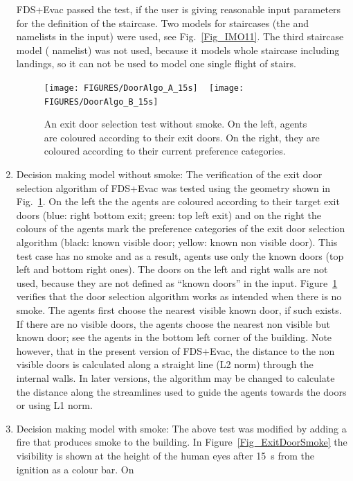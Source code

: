 \documentclass[12pt,a4paper,final,twoside]{stylevk}
\begin{document}
\begin{enumerate}
  FDS+Evac passed the test, if the user is giving reasonable input
  parameters for the definition of the staircase.  Two models for
  staircases (the  and  namelists in the
  input) were used, see Fig.~\ref{Fig_IMO11}.  The third staircase
  model ( namelist) was not used, because it models
  whole staircase including landings, so it can not be used to model
  one single flight of stairs.
%
\begin{figure}[!tb]
  \centerline{\texttt{[image: FIGURES/DoorAlgo\_A\_15s]} ~ \texttt{[image: FIGURES/DoorAlgo\_B\_15s]}} 
  \caption{An exit door selection test without
    smoke.  On the left, agents are coloured according to their exit
    doors. On the right, they are coloured according to their current
    preference categories.}\label{Fig_ExitDoorNoSmoke}
\end{figure}
%
%
\item Decision making model without smoke: The verification of the
  exit door selection algorithm of FDS+Evac was tested using the
  geometry shown in Fig.~\ref{Fig_ExitDoorNoSmoke}.  On the left the
  the agents are coloured according to their target exit doors (blue:
  right bottom exit; green: top left exit) and on the right the
  colours of the agents mark the preference categories of the exit
  door selection algorithm (black: known visible door; yellow: known
  non visible door).  This test case has no smoke and as a result,
  agents use only the known doors (top left and bottom right ones).
  The doors on the left and right walls are not used, because they are
  not defined as ``known doors'' in the input.
  Figure~\ref{Fig_ExitDoorNoSmoke} verifies that the door selection
  algorithm works as intended when there is no smoke.  The agents
  first choose the nearest visible known door, if such exists.  If
  there are no visible doors, the agents choose the nearest non
  visible but known door; see the agents in the bottom left corner of
  the building.  Note however, that in the present version of
  FDS+Evac, the distance to the non visible doors is calculated along
  a straight line (L2 norm) through the internal walls.  In later
  versions, the algorithm may be changed to calculate the distance
  along the streamlines used to guide the agents towards the doors or
  using L1 norm.
%
\item Decision making model with smoke: The above test was modified by
  adding a fire that produces smoke to the building.  In
  Figure~\ref{Fig_ExitDoorSmoke} the visibility is shown at the height
  of the human eyes after 15~s from the ignition as a colour bar.  On

\end{enumerate}
\end{document}

